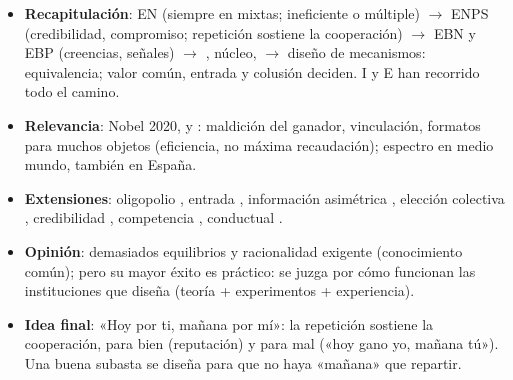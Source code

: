 \documentclass{article}
\begin{document}
\begin{columnas}
\begin{itemize}
\item \textbf{Recapitulación}: EN (siempre en mixtas; ineficiente o múltiple) $\to$ ENPS (credibilidad, compromiso; repetición sostiene la cooperación) $\to$ EBN y EBP (creencias, señales) $\to$ , núcleo,  $\to$ diseño de mecanismos: equivalencia; valor común, entrada y colusión deciden. I y E han recorrido todo el camino.
\item \textbf{Relevancia}: Nobel 2020,  y : maldición del ganador, vinculación, formatos para muchos objetos (eficiencia, no máxima recaudación); espectro en medio mundo, también en España.
\item \textbf{Extensiones}: oligopolio , entrada , información asimétrica , elección colectiva , credibilidad , competencia , conductual .
\item \textbf{Opinión}: demasiados equilibrios y racionalidad exigente (conocimiento común); pero su mayor éxito es práctico: se juzga por cómo funcionan las instituciones que diseña (teoría + experimentos + experiencia).
\item \textbf{Idea final}: «Hoy por ti, mañana por mí»: la repetición sostiene la cooperación, para bien (reputación) y para mal («hoy gano yo, mañana tú»). Una buena subasta se diseña para que no haya «mañana» que repartir.
\end{itemize}


\end{columnas}
\end{document}
